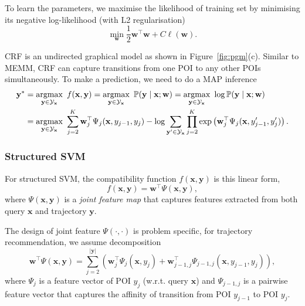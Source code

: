To learn the parameters, we maximise the likelihood of training set by minimising its negative log-likelihood (with L2 regularisation)
\begin{equation}
\label{eq:traincrf}
\min_{\mathbf{w}} \frac{1}{2} \mathbf{w}^\top \mathbf{w} + C \ell(\mathbf{w}).
\end{equation}

CRF is an undirected graphical model as shown in Figure~\ref{fig:pgm}(c).
Similar to MEMM, CRF can capture transitions from one POI to any other POIs simultaneously.
To make a prediction, we need to do a MAP inference
\begin{equation}
\label{eq:testcrf}
\begin{aligned}
\mathbf{y}^* 
&= \operatorname*{argmax}_{\mathbf{y} \in \mathcal{Y}_\mathbf{x}}~f(\mathbf{x}, \mathbf{y})
 = \operatorname*{argmax}_{\mathbf{y} \in \mathcal{Y}_\mathbf{x}}~\mathbb{P}(\mathbf{y} \mid \mathbf{x}; \mathbf{w})
 = \operatorname*{argmax}_{\mathbf{y} \in \mathcal{Y}_\mathbf{x}}~\log \mathbb{P}(\mathbf{y} \mid \mathbf{x}; \mathbf{w}) \\
&= \operatorname*{argmax}_{\mathbf{y} \in \mathcal{Y}_\mathbf{x}}~\sum_{j=2}^{K} \mathbf{w}_j^\top \Psi_j(\mathbf{x}, y_{j-1}, y_j) -
   \log \sum_{\mathbf{y}' \in \mathcal{Y}_\mathbf{x}} \prod_{j=2}^{K} \exp \left( \mathbf{w}_j^\top \Psi_j(\mathbf{x}, y_{j-1}', y_j') \right).
\end{aligned}
\end{equation}



\subsubsection{Structured SVM}
\label{sec:ssvm}

For structured SVM, the compatibility function $f(\mathbf{x}, \mathbf{y})$ is this linear form,
\begin{equation*}
f(\mathbf{x}, \mathbf{y}) = \mathbf{w}^\top \Psi(\mathbf{x}, \mathbf{y}),
\end{equation*}
where $\Psi(\mathbf{x}, \mathbf{y})$ is a \emph{joint feature map} 
that captures features extracted from both query $\mathbf{x}$ and trajectory $\mathbf{y}$.

The design of joint feature $\Psi(\cdot,\cdot)$ is problem specific, 
for trajectory recommendation, we assume decomposition
\begin{equation*}
\label{eq:jointfeature}
\mathbf{w}^\top \Psi(\mathbf{x}, \mathbf{y}) 
= \sum_{j=2}^{| \mathbf{y} |} 
  \left( \mathbf{w}_j^\top \Psi_j(\mathbf{x}, y_j) + 
  \mathbf{w}_{j-1,j}^\top \Psi_{j-1, j}(\mathbf{x}, y_{j-1}, y_j) \right),
\end{equation*}
where $\Psi_j$ is a feature vector of POI $y_j$ (w.r.t. query $\mathbf{x}$)
and $\Psi_{j-1,j}$ is a pairwise feature vector that captures the affinity of transition from POI $y_{j-1}$ to POI $y_j$.

